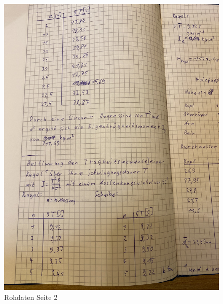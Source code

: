 \begin{figure}
  \centering
  \includegraphics[width=\textwidth, angle=270]{Bilder/Data2.jpg}
  \caption{Rohdaten Seite 2}
  \label{fig:Data2}
\end{figure}
